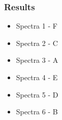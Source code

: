 \documentclass{report}
\begin{document}
	\subsubsection{Results}
	
		\begin{itemize}
			\item Spectra 1 - F
			\item Spectra 2 - C
			\item Spectra 3 - A
			\item Spectra 4 - E
			\item Spectra 5 - D
			\item Spectra 6 - B
		\end{itemize}
\end{document}
